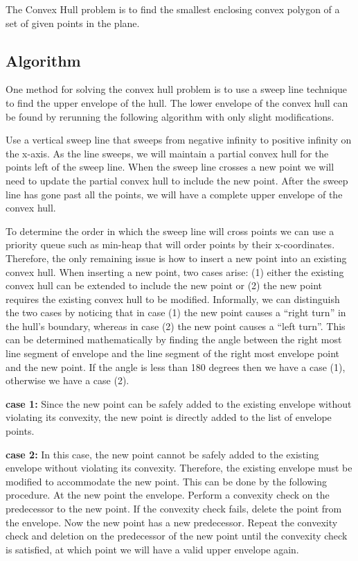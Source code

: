 \documentclass{article}
\begin{document}
The Convex Hull problem is to find the smallest enclosing convex polygon of a
set of given points in the plane.

\subsection{Algorithm}

One method for solving the convex hull problem is to use a sweep line technique
to find the upper envelope of the hull.  The lower envelope of the convex hull
can be found by rerunning the following algorithm with only slight
modifications.   

Use a vertical sweep line that sweeps from negative infinity to positive
infinity on the x-axis.  As the line sweeps, we will maintain a partial convex
hull for the points left of the sweep line.  When the sweep line crosses a new
point we will need to update the partial convex hull to include the new point.
After the sweep line has gone past all the points, we will have a complete upper
envelope of the convex hull.

To determine the order in which the sweep line will cross points we can use a
priority queue such as min-heap that will order points by their x-coordinates. 
Therefore, the only remaining issue is how to insert a new point into an
existing convex hull. When inserting a new point, two cases arise: (1) either
the existing convex hull can be extended to include the new point or (2) the
new point requires the existing convex hull to be modified.  Informally, we can
distinguish the two cases by noticing that in case (1) the new point causes a
``right turn'' in the hull's boundary, whereas in case (2) the new point causes
a ``left turn''. This can be determined mathematically by finding the angle
between the right most line segment of envelope and the line segment of the
right most envelope point and the new point.  If the angle is less than
180  degrees then we have a case (1), otherwise we have a case (2).

{\bf case 1: } 
Since the new point can be safely added to the existing envelope without
violating its convexity, the new point is directly added to the list of
envelope points.

{\bf case 2: } In this case, the new point cannot be safely added to the
existing envelope without violating its convexity. Therefore, the existing
envelope must be modified to accommodate the new point.  This can be done by the
following procedure.  At the new point the envelope.  Perform a convexity check
on the predecessor to the new point.  If the convexity check fails, delete the
point from the envelope.  Now the new point has a new predecessor.  Repeat the
convexity check and deletion on the predecessor of the new point until the
convexity check is satisfied, at which point we will have a valid upper envelope
again.
\end{document}

